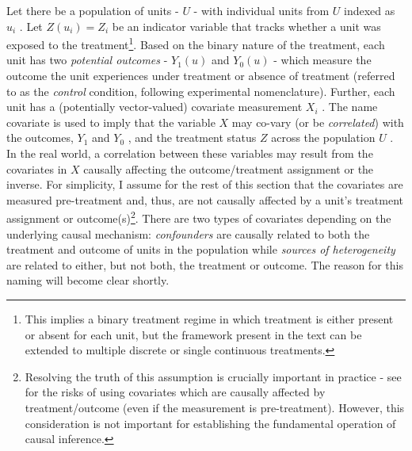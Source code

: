 \documentclass[../main.tex]{subfiles}
\begin{document}
\vspace{\baselineskip}
Let there be a population of units -  \( U \) - with individual units from  \( U \)  indexed as  \( u_{i} \) . Let  \( Z \left( u_{i} \right)  = Z_{i} \) be an indicator variable that tracks whether a unit was exposed to the treatment\footnote{ This implies a binary treatment regime in which treatment is either present or absent for each unit, but the framework present in the text can be extended to multiple discrete or single continuous treatments. }. Based on the binary nature of the treatment, each unit has two \textit{potential outcomes }-  \( Y_{1} \left( u \right)  \) and  \( Y_{0} \left( u \right)  \)  - which measure the outcome the unit experiences under treatment or absence of treatment (referred to as the \textit{control }condition, following experimental nomenclature). Further, each unit has a (potentially vector-valued) covariate measurement  \( X_{i} \) . The name covariate is used to imply that the variable  \( X \) may co-vary (or be \textit{correlated}) with the outcomes,  \( Y_{1} \) and  \( Y_{0} \) , and the treatment status  \( Z \) across the population \( U \) . In the real world, a correlation between these variables may result from the covariates in  \( X \) causally affecting the outcome/treatment assignment or the inverse. For simplicity, I assume for the rest of this section that the covariates are measured pre-treatment and, thus, are not causally affected by a unit’s treatment assignment or outcome(s)\footnote{ Resolving the truth of this assumption is crucially important in practice - see \textcite{Pearl2009CausalOverview} for the risks of using covariates which are causally affected by treatment/outcome (even if the measurement is pre-treatment). However, this consideration is not important for establishing the fundamental operation of causal inference.}. There are two types of covariates depending on the underlying causal mechanism: \textit{confounders} are causally related to both the treatment and outcome of units in the population while \textit{sources of heterogeneity }are related to either, but not both, the treatment or outcome. The reason for this naming will become clear shortly.\par
\end{document}
